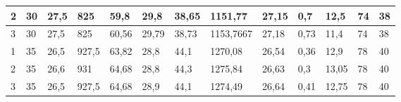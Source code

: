 \begin{table}[H]
{\begin{tabular}{|l|llll|lll|ll|l|ll|}
2             & \multicolumn{1}{l|}{\cellcolor[HTML]{E2EFDA}30}               & \multicolumn{1}{l|}{\cellcolor[HTML]{E2EFDA}27,5}             & \multicolumn{1}{l|}{\cellcolor[HTML]{E2EFDA}825}              & 59,8              & \multicolumn{1}{l|}{\cellcolor[HTML]{E2EFDA}29,8}              & \multicolumn{1}{l|}{\cellcolor[HTML]{E2EFDA}38,65}             & 1151,77           & \multicolumn{1}{l|}{\cellcolor[HTML]{E2EFDA}27,15}            & 0,7              & 12,5                      & \multicolumn{1}{l|}{\cellcolor[HTML]{E2EFDA}74}                  & 38               \\ \hline
\rowcolor[HTML]{C6E0B4} 
3             & \multicolumn{1}{l|}{\cellcolor[HTML]{C6E0B4}30}               & \multicolumn{1}{l|}{\cellcolor[HTML]{C6E0B4}27,5}             & \multicolumn{1}{l|}{\cellcolor[HTML]{C6E0B4}825}              & 60,56             & \multicolumn{1}{l|}{\cellcolor[HTML]{C6E0B4}29,79}             & \multicolumn{1}{l|}{\cellcolor[HTML]{C6E0B4}38,73}             & 1153,7667         & \multicolumn{1}{l|}{\cellcolor[HTML]{C6E0B4}27,18}            & 0,73             & 11,4                      & \multicolumn{1}{l|}{\cellcolor[HTML]{C6E0B4}74}                  & 38               \\ \hline
\rowcolor[HTML]{E2EFDA} 
1             & \multicolumn{1}{l|}{\cellcolor[HTML]{E2EFDA}35}               & \multicolumn{1}{l|}{\cellcolor[HTML]{E2EFDA}26,5}             & \multicolumn{1}{l|}{\cellcolor[HTML]{E2EFDA}927,5}            & 63,82             & \multicolumn{1}{l|}{\cellcolor[HTML]{E2EFDA}28,8}              & \multicolumn{1}{l|}{\cellcolor[HTML]{E2EFDA}44,1}              & 1270,08           & \multicolumn{1}{l|}{\cellcolor[HTML]{E2EFDA}26,54}            & 0,36             & 12,9                      & \multicolumn{1}{l|}{\cellcolor[HTML]{E2EFDA}78}                  & 40               \\ \hline
\rowcolor[HTML]{C6E0B4} 
2             & \multicolumn{1}{l|}{\cellcolor[HTML]{C6E0B4}35}               & \multicolumn{1}{l|}{\cellcolor[HTML]{C6E0B4}26,6}             & \multicolumn{1}{l|}{\cellcolor[HTML]{C6E0B4}931}              & 64,68             & \multicolumn{1}{l|}{\cellcolor[HTML]{C6E0B4}28,8}              & \multicolumn{1}{l|}{\cellcolor[HTML]{C6E0B4}44,3}              & 1275,84           & \multicolumn{1}{l|}{\cellcolor[HTML]{C6E0B4}26,63}            & 0,3              & 13,05                     & \multicolumn{1}{l|}{\cellcolor[HTML]{C6E0B4}78}                  & 40               \\ \hline
\rowcolor[HTML]{E2EFDA} 
3             & \multicolumn{1}{l|}{\cellcolor[HTML]{E2EFDA}35}               & \multicolumn{1}{l|}{\cellcolor[HTML]{E2EFDA}26,5}             & \multicolumn{1}{l|}{\cellcolor[HTML]{E2EFDA}927,5}            & 64,68             & \multicolumn{1}{l|}{\cellcolor[HTML]{E2EFDA}28,9}              & \multicolumn{1}{l|}{\cellcolor[HTML]{E2EFDA}44,1}              & 1274,49           & \multicolumn{1}{l|}{\cellcolor[HTML]{E2EFDA}26,64}            & 0,41             & 12,75                     & \multicolumn{1}{l|}{\cellcolor[HTML]{E2EFDA}78}                  & 40               \\ \hline

\end{tabular}}
\end{table}
